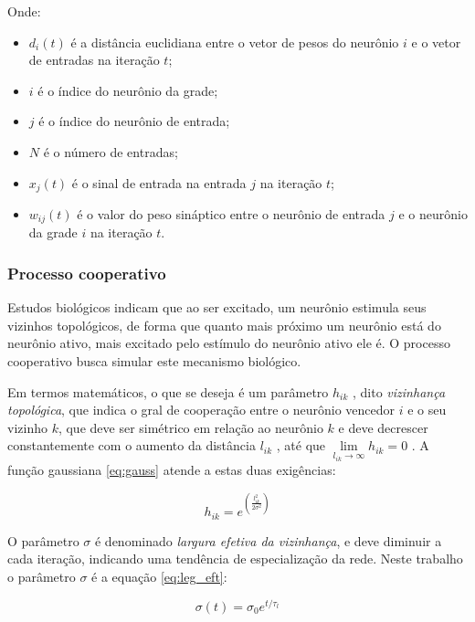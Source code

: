 Onde:

\begin{itemize}
\item $ d_i(t) $ é a distância euclidiana entre o vetor de pesos do
neurônio $ i $ e o vetor de entradas na iteração $ t $;
\item $ i $ é o índice do neurônio da grade;
\item $ j $ é o índice do neurônio de entrada;
\item $ N $ é o número de entradas;
\item $ x_j(t) $ é o sinal de entrada na entrada $ j $ na iteração $ t $;
\item $ w_{ij}(t) $ é o valor do peso sináptico entre o neurônio de
entrada $ j $ e o neurônio da grade $ i $ na iteração $ t $.
\end{itemize}

\subsubsection{Processo cooperativo}

Estudos biológicos indicam que ao ser excitado, um neurônio estimula seus
vizinhos topológicos, de forma que quanto mais próximo um neurônio está do
neurônio ativo, mais excitado pelo estímulo do neurônio ativo ele é. O processo
cooperativo busca simular este mecanismo biológico.

Em termos matemáticos, o que se deseja é um parâmetro $ h_{ik} $ , dito
\textit{vizinhança topológica}, que indica o gral de cooperação entre o
neurônio vencedor $ i $ e o seu vizinho $ k $, que deve ser simétrico em relação
ao neurônio $ k $ e deve decrescer constantemente com o aumento da
distância $ l_{ik} $ , até que $ \lim\limits_{ l_{ik} \to \infty } h_{ik} = 0 $ .
A função gaussiana \ref{eq:gauss} atende a estas duas exigências:

\begin{equation}\label{eq:gauss}
h_{ik} = e^{ \left( \frac{ l_{ik}^2 }{ 2 \sigma^2 } \right) }
\end{equation}

O parâmetro $ \sigma $ é denominado \textit{largura efetiva da vizinhança},
e deve diminuir a cada iteração, indicando uma tendência de especialização da
rede. Neste trabalho o parâmetro $ \sigma $ é a equação \ref{eq:leg_eft}:

\begin{equation}\label{eq:leg_eft}
\sigma(t) = \sigma_0 e^{ t / \tau_l }
\end{equation}


